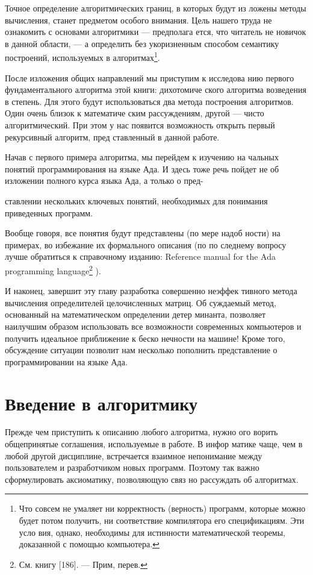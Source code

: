 	Точное определение алгоритмических границ, в которых будут из­
	ложены методы вычисления, станет предметом особого внимания. Цель
	нашего труда не ознакомить с основами алгоритмики — предполага­
	ется, что читатель не новичок в данной области, — а определить без­
	укоризненным способом семантику построений, используемых в алгоритмах\footnote{Что совсем не умаляет ни корректность (верность) программ, которые можно
	будет потом получить, ни соответствие компилятора его спецификациям. Эти усло­
	вия,  однако, необходимы для  истинности математической теоремы,  доказанной с
	помощью компьютера.}.
	
	После изложения общих направлений мы приступим к исследова­
	нию первого фундаментального алгоритма этой книги: дихотомиче­
	ского алгоритма возведения в степень. Для этого будут использоваться
	два метода построения алгоритмов. Один очень близок к математиче­
	ским рассуждениям, другой — чисто алгоритмический. При этом у нас
	появится возможность открыть первый рекурсивный алгоритм, пред­
	ставленный в данной работе.
	
	Начав с первого примера алгоритма, мы перейдем к изучению на­
	чальных понятий программирования на языке Ада. И здесь тоже речь
	пойдет не об изложении полного курса языка Ада, а только о пред-
	
	\pagebreak
	\noindent ставлении нескольких ключевых понятий, необходимых для понимания
	приведенных программ.
	
	Вообще говоря, все понятия будут представлены (по мере надоб­
	ности) на примерах, во избежание их формального описания (по по­
	следнему вопросу лучше обратиться к справочному изданию: Reference
	manual for the Ada programming language\footnote{См. книгу [186]. — Прим, перев.} ).
	
	И наконец, завершит эту главу разработка совершенно неэффек­
	тивного метода вычисления определителей целочисленных матриц. Об­
	суждаемый метод, основанный на математическом определении детер­
	минанта, позволяет наилучшим образом использовать все возможности
	современных компьютеров и получить идеальное приближение к беско­
	нечности на машине! Кроме того, обсуждение ситуации позволит нам
	несколько пополнить представление о программировании на языке Ада.
	
	\section{Введение в алгоритмику}
	\noindent Прежде чем приступить к описанию любого алгоритма, нужно ого­
	ворить общепринятые соглашения, используемые в работе. В инфор­
	матике чаще, чем в любой другой дисциплине, встречается взаимное
	непонимание между пользователем и разработчиком новых программ.
	Поэтому так важно сформулировать аксиоматику, позволяющую связ­
	но рассуждать об алгоритмах.
	
